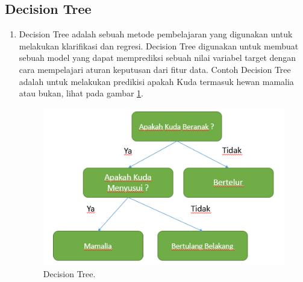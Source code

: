 \subsection{Decision Tree}
\begin{enumerate}
\item Decision Tree adalah sebuah metode pembelajaran yang digunakan untuk melakukan klarifikasi dan regresi. Decision Tree digunakan untuk membuat sebuah model yang dapat memprediksi sebuah nilai variabel target dengan cara mempelajari aturan keputusan dari fitur data. Contoh Decision Tree adalah untuk melakukan predikisi apakah Kuda termasuk hewan mamalia atau bukan, lihat pada gambar \ref{YNDT}.

		\begin{figure}[ht]
		\centerline{\includegraphics[width=1\textwidth]{figures/YN/YN56.png}}
		\caption{Decision Tree.}
		\label{YNDT}
		\end{figure}

\end{enumerate}

